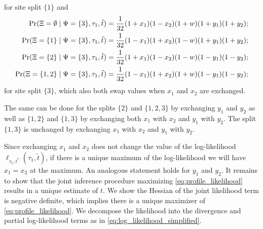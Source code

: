 for site split $\{1\}$ and
\begin{align*}
        \Pr(\Xi=\emptyset \mid \Psi=\{3\}, \tau_1, \tilde{t}) &= \frac{1}{32}(1+x_1)(1-x_2)(1+w)(1+y_1)(1+y_2); \\
    \Pr(\Xi=\{1\} \mid \Psi=\{3\}, \tau_1, \tilde{t}) &= \frac{1}{32}(1-x_1)(1+x_2)(1-w)(1+y_1)(1+y_2); \\
    \Pr(\Xi=\{2\} \mid \Psi=\{3\}, \tau_1, \tilde{t}) &= \frac{1}{32}(1+x_1)(1-x_2)(1-w)(1-y_1)(1-y_2); \\
    \Pr(\Xi=\{1,2\} \mid \Psi=\{3\}, \tau_1, \tilde{t}) &= \frac{1}{32}(1-x_1)(1+x_2)(1+w)(1-y_1)(1-y_2);
\end{align*}
for site split $\{3\}$, which also both swap values when $x_1$ and $x_2$ are exchanged.

The same can be done for the splits $\{2\}$ and $\{1,2,3\}$ by exchanging $y_1$ and $y_2$ as well as $\{1,2\}$ and $\{1,3\}$ by exchanging both $x_1$ with $x_2$ and $y_1$ with $y_2$.
The split $\{1,3\}$ is unchanged by exchanging $x_1$ with $x_2$ and $y_1$ with $y_2$.

Since exchanging $x_1$ and $x_2$ does not change the value of the log-likelihood $\ell_{\tau_1,t^*}(\tau_1, \tilde{t})$, if there is a unique maximum of the log-likelihood we will have $x_1=x_2$ at the maximum.
An analogous statement holds for $y_1$ and $y_2$.
It remains to show that the joint inference procedure maximizing \eqref{eq:profile_likelihood} results in a unique estimate of $t$.
We show the Hessian of the joint likelihood term is negative definite, which implies there is a unique maximizer of \eqref{eq:profile_likelihood}.
We decompose the likelihood into the divergence and partial log-likelihood terms as in \eqref{eq:log_likelihood_simplified}.

